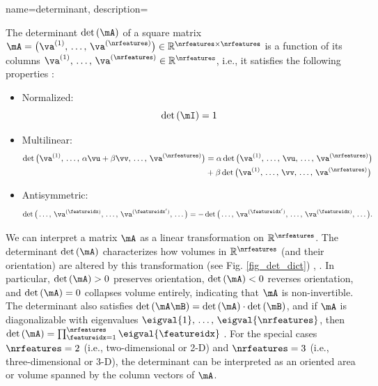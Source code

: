 {name={determinant},
	description={The determinant $\det\,(\mA)$ of a square \gls{matrix} 
		$\mA =\linebreak \big( \va^{(1)},\,\ldots,\,\va^{(\nrfeatures)} \big) \in \mathbb{R}^{\nrfeatures \times \nrfeatures}$ is a 
		\gls{function} of its columns $\va^{(1)},\,\ldots,\,\va^{(\nrfeatures)} \in \mathbb{R}^{\nrfeatures}$, i.e., it satisfies 
		the following properties \cite{DirschmidHansJorg1996TuF}:
		\begin{itemize}
			\item Normalized: $$\det\,(\mI) = 1$$ 
			\item Multilinear: \begin{align} \nonumber \det \big(\va^{(1)},\,\ldots,\,\alpha\vu+ \beta \vv,\,\ldots,\,\va^{(\nrfeatures)} \big) & = \alpha\det \big(\va^{(1)},\,\ldots,\,\vu,\,\ldots,\,\va^{(\nrfeatures)} \big) \\ 
			& +\beta\det \big(\va^{(1)},\,\ldots,\,\vv,\,\ldots,\,\va^{(\nrfeatures)} \big) \nonumber
			\end{align}
			\item Antisymmetric: $$\det \big(\ldots,\,\va^{(\featureidx)}, \,\ldots, \,\va^{(\featureidx')},\,\ldots \big) = - \det \big(\ldots,\,\va^{(\featureidx')}, \,\ldots, \,\va^{(\featureidx)},\,\ldots \big).$$ 
		\end{itemize} 
		We can interpret a \gls{matrix} $\mA$ as a linear transformation on $\mathbb{R}^{\nrfeatures}$.
		The determinant $\det\,(\mA)$ characterizes how volumes in $\mathbb{R}^\nrfeatures$ (and their orientation) 
		are altered by this transformation (see Fig. \ref{fig_det_dict}) \cite{GolubVanLoanBook}, \cite{Strang2007}. 
 		In particular, $\det\,(\mA) > 0$ preserves orientation, $\det\,(\mA) < 0$ reverses orientation, 
 		and $\det\,(\mA) = 0$ collapses volume entirely, indicating that $\mA$ is non-invertible. 
 		The determinant also satisfies $\det\,(\mA \mB) = \det\,(\mA) \cdot \det\,(\mB)$, and if $\mA$ is 
 		diagonalizable with \glspl{eigenvalue} $\eigval{1}, \,\ldots, \,\eigval{\nrfeatures}$, then 
		$\det\,(\mA) = \prod_{\featureidx=1}^{\nrfeatures} \eigval{\featureidx}$ \cite{HornMatAnalysis}.
    		For the special cases $\nrfeatures=2$ (i.e., two-dimensional or 2-D) and $\nrfeatures=3$ (i.e., three-dimensional or 3-D), 
		the determinant can be interpreted as an oriented area or volume spanned by the column \glspl{vector} of $\mA$.
    		\begin{figure}[H]
    			\begin{center}

\end{center}
\end{figure}}}
